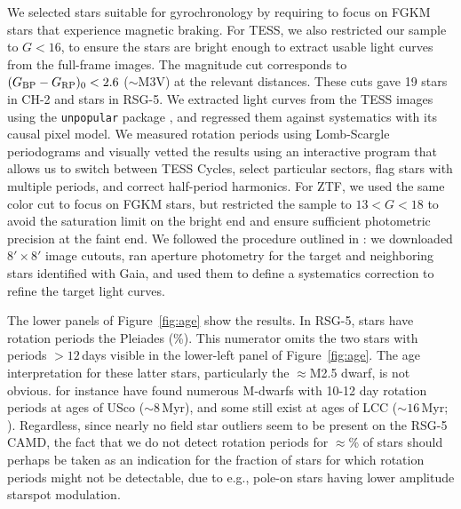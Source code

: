 \documentclass[12pt,twocolumn,tighten,linenumbers,trackchanges]{aastex63}
\newcommand{\bpmrpo}{(G_{\rm BP}-G_{\rm RP})_0}
\begin{document}
We selected stars suitable for gyrochronology by requiring 
\replaced{$\bpmrpo \geq 0.5$}{$\bpmrpo \geq 0.6$} to focus on FGKM stars that experience magnetic
braking.
For TESS, we also restricted our sample to $G<16$, to ensure the stars
are bright enough to extract usable light curves from the full-frame
images.  The magnitude cut corresponds to $\bpmrpo < 2.6$
($\sim$M3V) at the relevant distances.  These cuts gave 19 stars in
CH-2 and  stars in RSG-5.  We extracted light curves from the TESS
images using the \texttt{unpopular} package \citep{hattorio_2021_cpm},
and regressed them against systematics with its causal pixel model.
We measured rotation periods using Lomb-Scargle periodograms and
visually vetted the results using an interactive program that allows
us to switch between TESS Cycles, select particular sectors, flag
stars with multiple periods, and correct half-period harmonics. For
ZTF, we used the same color cut to focus on FGKM stars, but restricted
the sample to $13 < G < 18$ to avoid the saturation limit on the
bright end and ensure sufficient photometric precision at the faint
end. We followed the procedure outlined in \citet{curtis_rup147_2020}:
we downloaded $8'\times8'$ image cutouts, ran aperture photometry for
the target and neighboring stars identified with Gaia, and used them
to define a systematics correction to refine the target light curves. 

The lower panels of Figure~\ref{fig:age} show the results.  In RSG-5,
 stars have rotation periods  the Pleiades (\%).  This
numerator omits the two stars with periods $>$$12$\,days visible in
the lower-left panel of Figure~\ref{fig:age}.  The age interpretation
for these latter stars, particularly the $\approx$M2.5 dwarf, is not
obvious.  \citet{rebull_usco_2018} for instance have found numerous
M-dwarfs with 10-12 day rotation periods at ages of USco
($\sim$$8$\,Myr), and some  still exist at ages of
LCC ($\sim$$16$\,Myr; ).  Regardless, since nearly
no field star outliers seem to be present on the RSG-5 CAMD, the fact
that we do not detect rotation periods for $\approx$\%
of stars should perhaps be taken as an indication for the fraction of
stars for which rotation periods might not be detectable, due to
{e.g.}, pole-on stars having lower amplitude starspot modulation.
\end{document}
